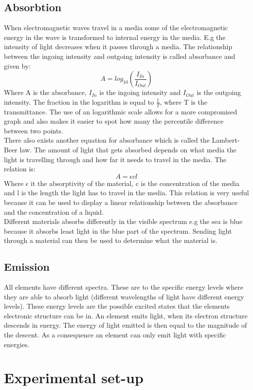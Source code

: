 \documentclass[working, oneside]{inputs/tuftebook}
\begin{document}
\subsection*{Absorbtion}
When electromagnetic waves travel in a media some of the electromagnetic energy in the wave is transformed to internal energy in the media. E.g the intensity of light decreases when it passes through a media. The relationship between the ingoing intensity and outgoing intensity is called absorbance and given by:
\[
A = log_{10}(\frac{I_{In}}{I_{Out}})
\]
Where A is the absorbance, $I_{In}$ is the ingoing intensity and $I_{Out}$ is the outgoing intensity. The fraction in the logarithm is equal to $\frac{1}{T}$, where T is the transmittance. The use of an logarithmic scale allows for a more compromised graph and also makes it easier to spot how many the percentile difference between two points. \\
There also exists another equation for absorbance which is called the Lambert-Beer law. The amount of light that gets absorbed depends on what media the light is travelling through and how far it needs to travel in the media. The relation is:
\[
A = \epsilon c l
\]  
Where $\epsilon$ it the absorptivity of the material, c is the concentration of the media and l is the length the light has to travel in the media. This relation is very useful because it can be used to display a linear relationship between the absorbance and the concentration of a liquid.
\\
Different materials absorbs differently in the visible spectrum e.g the sea is blue because it absorbs least light in the blue part of the spectrum. Sending light through a material can then be used to determine what the material is.
\subsection*{Emission}
All elements have different spectra. These are to the specific energy levels where they are able to absorb light (different wavelengths of light have different energy levels). These energy levels are the possible excited states that the elements electronic structure can be in. An element emits light, when its electron structure descends in energy. The energy of light emitted is then equal to the magnitude of the descent. As a consequence an element can only emit light with specific energies.
\section*{Experimental set-up}
\end{document}
